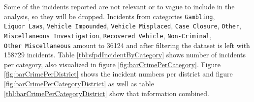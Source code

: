 \documentclass[10pt,parskip=half,
toc=sectionentrywithdots,
bibliography=totocnumbered,
captions=tableheading,numbers=noendperiod]{scrartcl}
\begin{document}
\begin{table}[H]
\caption{Top 5 rows, only relevant columns}\label{tbl:sfpdRelevantCols}
\centering
\begin{adjustbox}{max width=\textwidth}
\end{adjustbox}
\end{table}

Some of the incidents reported are not relevant or to vague to include
in the analysis, so they will be dropped. Incidents from categories
\texttt{Gambling}, \texttt{Liquor\ Laws}, \texttt{Vehicle\ Impounded},
\texttt{Vehicle\ Misplaced}, \texttt{Case\ Closure}, \texttt{Other},
\texttt{Miscellaneous\ Investigation}, \texttt{Recovered\ Vehicle},
\texttt{Non-Criminal}, \texttt{Other\ Miscellaneous} amount to 36124 and
after filtering the dataset is left with 158729 incidents. Table
\ref{tbl:sfpdIncidentByCategory} shows number of incidents per category,
also visualized in figure \ref{fig:barCrimePerCategory}. Figure
\ref{fig:barCrimePerDistrict} shows the incident numbers per district
and figure \ref{fig:barCrimePerCategoryDistrict} as well as table
\ref{tbl:barCrimePerCategoryDistrict} show that information combined.
\end{document}
